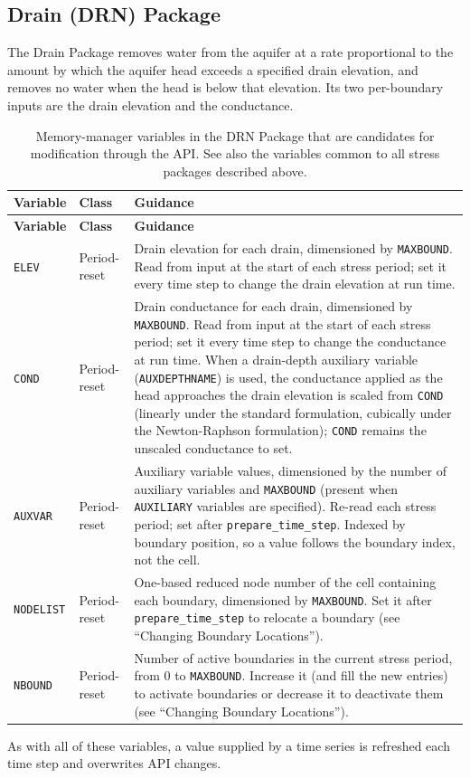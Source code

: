 \subsection{Drain (DRN) Package}

The Drain Package removes water from the aquifer at a rate proportional to the
amount by which the aquifer head exceeds a specified drain elevation, and removes
no water when the head is below that elevation. Its two per-boundary inputs are
the drain elevation and the conductance.

\begin{longtable}{p{} p{} p{}}
\caption{Memory-manager variables in the DRN Package that are candidates for
modification through the API. See also the variables common to all stress
packages described above.} \label{table:api-gwf-drn} \\

\hline
\textbf{Variable} & \textbf{Class} & \textbf{Guidance} \\
\hline
\endfirsthead

\hline
\textbf{Variable} & \textbf{Class} & \textbf{Guidance} \\
\hline
\endhead

\texttt{ELEV} & Period-reset &
Drain elevation for each drain, dimensioned by \texttt{MAXBOUND}. Read from input
at the start of each stress period; set it every time step to change the drain
elevation at run time. \\

\texttt{COND} & Period-reset &
Drain conductance for each drain, dimensioned by \texttt{MAXBOUND}. Read from
input at the start of each stress period; set it every time step to change the
conductance at run time. When a drain-depth auxiliary variable
(\texttt{AUXDEPTHNAME}) is used, the conductance applied as the head approaches
the drain elevation is scaled from \texttt{COND} (linearly under the standard
formulation, cubically under the Newton-Raphson formulation); \texttt{COND}
remains the unscaled conductance to set. \\

\texttt{AUXVAR} & Period-reset &
Auxiliary variable values, dimensioned by the number of auxiliary variables and
\texttt{MAXBOUND} (present when \texttt{AUXILIARY} variables are specified).
Re-read each stress period; set after \texttt{prepare\_time\_step}. Indexed by
boundary position, so a value follows the boundary index, not the cell. \\

\texttt{NODELIST} & Period-reset &
One-based reduced node number of the cell containing each boundary, dimensioned
by \texttt{MAXBOUND}. Set it after \texttt{prepare\_time\_step} to relocate a
boundary (see ``Changing Boundary Locations''). \\

\texttt{NBOUND} & Period-reset &
Number of active boundaries in the current stress period, from 0 to
\texttt{MAXBOUND}. Increase it (and fill the new entries) to activate boundaries
or decrease it to deactivate them (see ``Changing Boundary Locations''). \\

\hline
\end{longtable}

\noindent As with all of these variables, a value supplied by a time series is
refreshed each time step and overwrites API changes.
